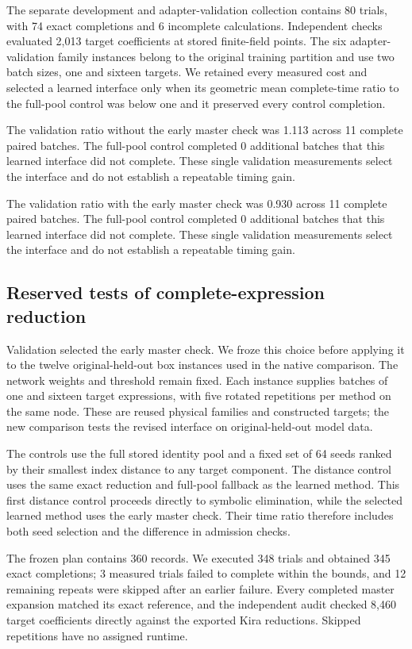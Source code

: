 The separate development and adapter-validation collection contains 80 trials, with 74 exact completions and 6 incomplete calculations. Independent checks evaluated 2,013 target coefficients at stored finite-field points. The six adapter-validation family instances belong to the original training partition and use two batch sizes, one and sixteen targets. We retained every measured cost and selected a learned interface only when its geometric mean complete-time ratio to the full-pool control was below one and it preserved every control completion.

The validation ratio without the early master check was 1.113 across 11 complete paired batches. The full-pool control completed 0 additional batches that this learned interface did not complete. These single validation measurements select the interface and do not establish a repeatable timing gain.

The validation ratio with the early master check was 0.930 across 11 complete paired batches. The full-pool control completed 0 additional batches that this learned interface did not complete. These single validation measurements select the interface and do not establish a repeatable timing gain.

\subsection{Reserved tests of complete-expression reduction}

Validation selected the early master check. We froze this choice before applying it to the twelve original-held-out box instances used in the native comparison. The network weights and threshold remain fixed. Each instance supplies batches of one and sixteen target expressions, with five rotated repetitions per method on the same node. These are reused physical families and constructed targets; the new comparison tests the revised interface on original-held-out model data.

The controls use the full stored identity pool and a fixed set of 64 seeds ranked by their smallest index distance to any target component. The distance control uses the same exact reduction and full-pool fallback as the learned method. This first distance control proceeds directly to symbolic elimination, while the selected learned method uses the early master check. Their time ratio therefore includes both seed selection and the difference in admission checks.

The frozen plan contains 360 records. We executed 348 trials and obtained 345 exact completions; 3 measured trials failed to complete within the bounds, and 12 remaining repeats were skipped after an earlier failure. Every completed master expansion matched its exact reference, and the independent audit checked 8,460 target coefficients directly against the exported Kira reductions. Skipped repetitions have no assigned runtime.


